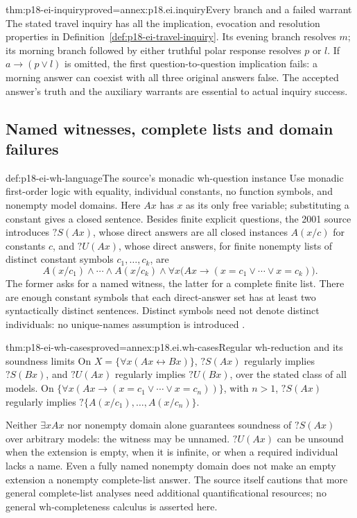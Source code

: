 \begin{hbtheorem}{thm:p18-ei-inquiry}{proved=annex:p18.ei.inquiry}{Every branch and a failed warrant}
The stated travel inquiry has all the implication, evocation and resolution
properties in Definition~\ref{def:p18-ei-travel-inquiry}. Its evening branch
resolves \(m\); its morning branch followed by either truthful polar response
resolves \(p\) or \(l\). If \(a\to(p\lor l)\) is omitted, the first
question-to-question implication fails: a morning answer can coexist with
all three original answers false. The accepted answer's truth and the
auxiliary warrants are essential to actual inquiry success.
\end{hbtheorem}

\subsection{Named witnesses, complete lists and domain failures}

\begin{hbdefinition}{def:p18-ei-wh-language}{The source's monadic wh-question instance}
Use monadic first-order logic with equality, individual constants, no
function symbols, and nonempty model domains. Here \(Ax\) has \(x\) as
its only free variable; substituting a constant gives a closed sentence.
Besides finite explicit
questions, the 2001 source introduces \(?S(Ax)\), whose direct answers
are all closed instances \(A(x/c)\) for constants \(c\), and
\(?U(Ax)\), whose direct answers, for finite nonempty lists of distinct
constant symbols \(c_1,\ldots,c_k\), are
\[
 A(x/c_1)\land\cdots\land A(x/c_k)\land
 \forall x\bigl(Ax\to(x=c_1\lor\cdots\lor x=c_k)\bigr).
\]
The former asks for a named witness, the latter for a complete finite list.
There are enough constant symbols that each direct-answer set has at least
two syntactically distinct sentences. Distinct symbols need not denote
distinct individuals: no unique-names assumption is introduced
\cite[pp.~20--22,29]{Wisniewski2001QuestionsInferences}.
\end{hbdefinition}

\begin{hbtheorem}{thm:p18-ei-wh-cases}{proved=annex:p18.ei.wh-cases}{Regular wh-reduction and its soundness limits}
On \(X=\{\forall x(Ax\leftrightarrow Bx)\}\), \(?S(Ax)\) regularly
implies \(?S(Bx)\), and \(?U(Ax)\) regularly implies \(?U(Bx)\),
over the stated class of all models. On
\(\{\forall x(Ax\to(x=c_1\lor\cdots\lor x=c_n))\}\), with \(n>1\),
\(?S(Ax)\) regularly implies \(?\{A(x/c_1),\ldots,A(x/c_n)\}\).

Neither \(\exists xAx\) nor nonempty domain alone guarantees soundness
of \(?S(Ax)\) over arbitrary models: the witness may be unnamed.
\(?U(Ax)\) can be unsound when the extension is empty, when it is infinite,
or when a required individual lacks a name. Even a fully named nonempty
domain does not make an empty extension a nonempty complete-list answer.
The source itself cautions that more general complete-list analyses need
additional quantificational resources; no general wh-completeness calculus
is asserted here.
\end{hbtheorem}

